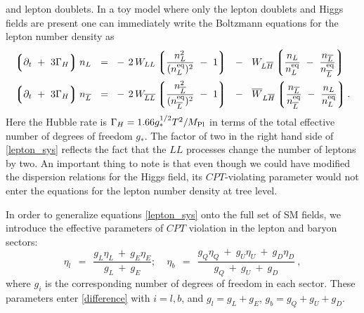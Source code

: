 \documentclass[12pt]{revtex4}
\newcommand{\eq}{{\rm eq}}
\newcommand{\lgr}{\left\lgroup}
\newcommand{\rgr}{\right\rgroup}
\newcommand{\Mpl}{M_{\rm Pl}}
\newcommand{\p}{\partial}
\newcommand{\ov}{\overline}
\begin{document}
	and lepton doublets.
	In a toy model where only the lepton doublets and Higgs fields are present 
    one can immediately write the Boltzmann equations for the lepton number density as
\begin{equation}
\label{lepton_sys}
\begin{split}
	\lgr \p_t ~+~ 3\Gamma_H \rgr 
		n_L ~~=~~ &
	-\, 2\, W_{LL} \lgr \frac{n_L^2}{(n_L^\eq)^2} ~-~ 1 \rgr
	~~-~~
	W_{L\ov{H}} \lgr \frac{n_L}{n_L^\eq} ~-~ 
			\frac{n_{\ov{L}}}{n_{\ov{L}}^\eq} \rgr  \\
	\lgr \p_t ~+~ 3\Gamma_H \rgr 
		n_{\ov{L}} ~~=~~ &
	-\, 2\, W_{\ov{LL}} \lgr 
		\frac{n_{\ov{L}}^2}{(n_{\ov{L}}^\eq)^2} ~-~ 1 \rgr
	~~-~~
	\ov{W}_{L\ov{H}} \lgr \frac{n_{\ov{L}}}{n_{\ov{L}}^\eq} ~-~ 
			\frac{n_L}{n_L^\eq} \rgr.  \\
\end{split}
\end{equation}
	Here the Hubble rate is $\Gamma_H = 1.66 g_*^{1/2} T^2/\Mpl $ in terms of the 
total effective number of degrees of freedom $g_*$. 
The factor of two in the right hand side of \eqref{lepton_sys} reflects the fact 
	that the $LL$ processes change the number of leptons by two.
	An important thing to note is that even though we could have 
	modified the dispersion relations for the Higgs field, 
	its $CPT$-violating parameter would not enter the equations for the lepton number
	density at tree level.
	
	In order to generalize equations \eqref{lepton_sys} onto the full set of 
	SM fields, we introduce the effective parameters of $CPT$ violation in the 
	lepton and baryon sectors:
\begin{equation}
	\eta_l ~~=~~ \frac{ g_L \eta_L ~+~ g_E \eta_E } { g_L ~+~ g_E };~~~~~\eta_b ~~=~~ \frac{g_Q \eta_Q ~+~ g_U \eta_U ~+~ g_D \eta_D} 
			    {g_Q ~+~ g_U ~+~ g_D}~,
\label{effective}
  \end{equation}
where $g_i$ is the corresponding number of degrees of freedom in each sector. These parameters 
enter \eqref{difference} with $i=l,b$, and $g_l = g_L +g_E $,  $g_b= g_Q+g_U+g_D$. 
\end{document}
